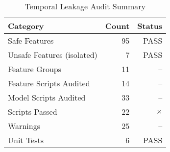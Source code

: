 
\begin{table}[htbp]
\centering
\caption{Temporal Leakage Audit Summary}
\label{tab:leakage_audit}
\begin{tabular}{@{} l r r @{}}
\toprule
\textbf{Category} & \textbf{Count} & \textbf{Status} \\
\midrule
Safe Features & 95 & PASS \\
Unsafe Features (isolated) & 7 & PASS \\
Feature Groups & 11 & -- \\
\midrule
Feature Scripts Audited & 14 & -- \\
Model Scripts Audited & 33 & -- \\
\midrule
Scripts Passed & 22 & $\times$ \\
Warnings & 25 & -- \\
\midrule
Unit Tests & 6 & PASS \\
\bottomrule
\end{tabular}
\end{table}